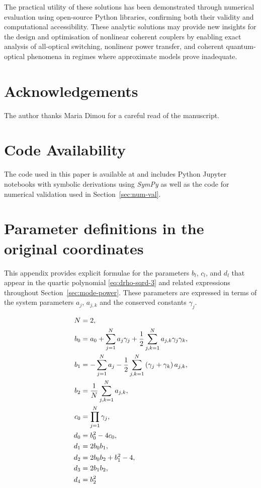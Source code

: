 \documentclass[11pt,a4paper]{article}
\numberwithin{equation}{section}
\begin{document}
The practical utility of these solutions has been demonstrated through numerical evaluation using open-source Python libraries, confirming both their validity and computational accessibility.
These analytic solutions may provide new insights for the design and optimisation of nonlinear coherent couplers by enabling exact analysis of all-optical switching, nonlinear power transfer, and coherent quantum-optical phenomena in regimes where approximate models prove inadequate.


\section*{Acknowledgements}
The author thanks Maria Dimou for a careful read of the manuscript.

\section*{Code Availability}
The code used in this paper is available at \cite{heskethHeskethGDCoherentcouplerpaper2026} and includes Python Jupyter notebooks with symbolic derivations using \emph{SymPy} \cite{meurerSymPySymbolicComputing2017} as well as the code for numerical validation used in Section~\ref{sec:num-val}.

\appendix



\section{Parameter definitions in the original coordinates}
\label{app:param-def-appendix}

This appendix provides explicit formulae for the parameters $b_l$, $c_l$, and $d_l$ that appear in the quartic polynomial \eqref{eq:drho-sqrd-3} and related expressions throughout Section~\ref{sec:mode-power}.
These parameters are expressed in terms of the system parameters $a_j$, $a_{j,k}$ and the conserved constants $\gamma_j$.

\begin{align}
N &= 2,\\
{b}_{0} &= {a}_{0} + \sum_{j=1}^{N} {a}_{j} {\gamma}_{j} + \frac{1}{2}\sum\limits_{j,k=1}^{N} {a}_{j,k} {\gamma}_{j} {\gamma}_{k}, \notag \\
{b}_{1} &= - \sum_{j=1}^{N} {a}_{j} - \frac{1}{2}\sum\limits_{j,k=1}^{N} \left({\gamma}_{j} + {\gamma}_{k}\right) {a}_{j,k}, \notag \\
{b}_{2} &= \frac{1}{N}\sum\limits_{j,k=1}^{N} {a}_{j,k}, \notag \\
{c}_{0} &= \prod_{j=1}^{N} {\gamma}_{j}, \notag \\
{d}_{0} &= {b}_{0}^{2} - 4 {c}_{0}, \notag \\
{d}_{1} &= 2 {b}_{0} {b}_{1}, \notag \\
{d}_{2} &= 2 {b}_{0} {b}_{2} + {b}_{1}^{2} - 4, \notag \\
{d}_{3} &= 2 {b}_{1} {b}_{2}, \notag \\
{d}_{4} &= {b}_{2}^{2}
\end{align}
\end{document}

